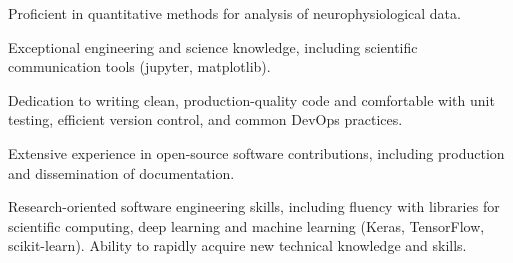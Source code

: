 

\begin{cventries}
    \vspace{2mm}
    \begin{cvparagraph}
        \begin{cvitems}
            \item{Proficient in quantitative methods for analysis of neurophysiological data.}
            \item{Exceptional engineering and science knowledge, including scientific communication tools (jupyter, matplotlib).}
            \item{Dedication to writing clean, production-quality code and comfortable with unit testing, efficient version control, and common DevOps practices.}
            \item{Extensive experience in open-source software contributions, including production and dissemination of documentation.}
            \item{Research-oriented software engineering skills, including fluency with libraries for scientific computing, deep learning
            and machine learning (Keras, TensorFlow, scikit-learn). Ability to rapidly acquire new technical knowledge and skills.}
        \end{cvitems}
    \end{cvparagraph}

\end{cventries}
